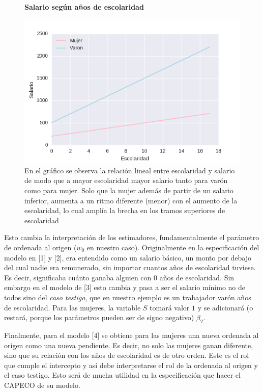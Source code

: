 \begin{figure}[h]
		\centering
		\textbf{Salario según años de escolaridad}\par\medskip
		\includegraphics[scale = 0.7]{../img/capitulo2/modelo4.png}
		\caption{En el gráfico se observa la relación lineal entre escolaridad y salario de modo que a mayor escolaridad mayor salario tanto para varón como para mujer. Solo que la mujer además de partir de un salario inferior, aumenta a un ritmo diferente (menor) con el aumento de la escolaridad, lo cual amplía la brecha en los tramos superiores de escolaridad}
\end{figure}

Esto cambia la interpretación de los estimadores, fundamentalmente el parámetro de ordenada al origen ($w_0$ en nuestro caso). Originalmente en la especificación del modelo en [1] y [2], era entendido como un salario básico, un monto por debajo del cual nadie era remunerado, sin importar cuantos años de escolaridad tuviese. Es decir, significaba cuánto ganaba alguien con 0 años de escolaridad. Sin embargo en el modelo  de [3] esto cambia y pasa a ser el salario mínimo no de todos sino del \textit{caso testigo}, que en nuestro ejemplo es un trabajador varón años de escolaridad. Para las mujeres, la variable $S$ tomará valor $1$ y se adicionará (o restará, porque los parámetros pueden ser de signo negativo) $\beta_2$. 

Finalmente, para el modelo [4] se obtiene para las mujeres una nueva ordenada al origen como una nueva pendiente. Es decir, no solo las mujeres ganan diferente, sino que su relación con los años de escolaridad es de otro orden. Este es el rol que cumple el intercepto y así debe interpretarse el rol de la ordenada al origen y el caso testigo. Esto será de mucha utilidad en la especificación que hacer el CAPECO de su modelo.

